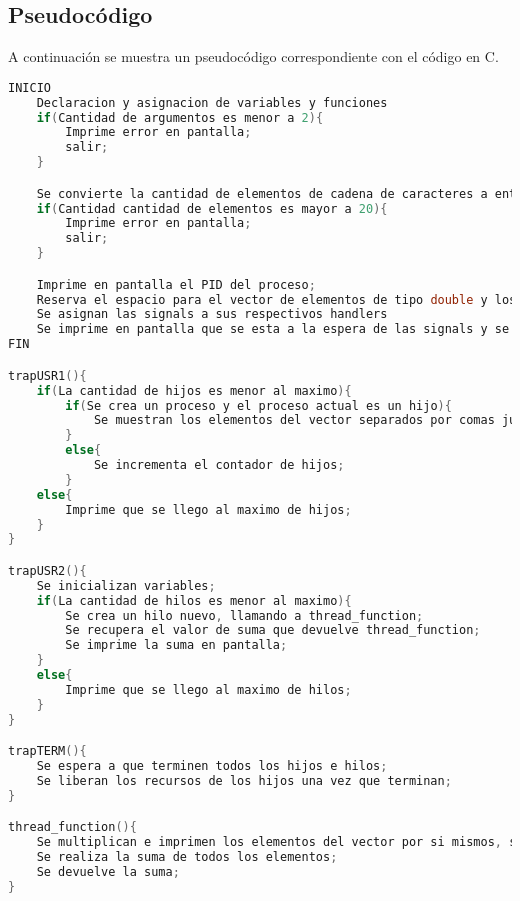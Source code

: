 \subsection{Pseudocódigo}

A continuación se muestra un pseudocódigo correspondiente con el código en C.\\

\begin{lstlisting}[language=C]
INICIO
    Declaracion y asignacion de variables y funciones
    if(Cantidad de argumentos es menor a 2){
        Imprime error en pantalla;
        salir;
    }

    Se convierte la cantidad de elementos de cadena de caracteres a entero;
    if(Cantidad cantidad de elementos es mayor a 20){
        Imprime error en pantalla;
        salir;
    }

    Imprime en pantalla el PID del proceso;
    Reserva el espacio para el vector de elementos de tipo double y los genera;
    Se asignan las signals a sus respectivos handlers
    Se imprime en pantalla que se esta a la espera de las signals y se queda esperando;
FIN

trapUSR1(){
    if(La cantidad de hijos es menor al maximo){
        if(Se crea un proceso y el proceso actual es un hijo){
            Se muestran los elementos del vector separados por comas junto con la identificacion del proceso padre;
        }
        else{
            Se incrementa el contador de hijos;
        }
    else{
        Imprime que se llego al maximo de hijos;
    }
}

trapUSR2(){
    Se inicializan variables;
    if(La cantidad de hilos es menor al maximo){
        Se crea un hilo nuevo, llamando a thread_function;
        Se recupera el valor de suma que devuelve thread_function;
        Se imprime la suma en pantalla;
    }
    else{
        Imprime que se llego al maximo de hilos;
    }
}

trapTERM(){
    Se espera a que terminen todos los hijos e hilos;
    Se liberan los recursos de los hijos una vez que terminan;
}

thread_function(){
    Se multiplican e imprimen los elementos del vector por si mismos, separados por espacios;
    Se realiza la suma de todos los elementos;
    Se devuelve la suma;
}


\end{lstlisting}